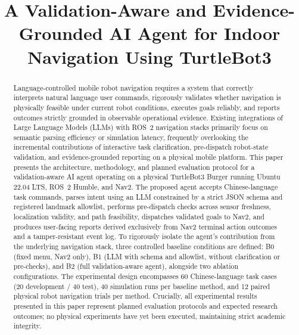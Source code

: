 \documentclass[conference]{IEEEtran}
\begin{document}
\title{A Validation-Aware and Evidence-Grounded AI Agent for Indoor Navigation Using TurtleBot3}

\author{
}

\maketitle

\begin{abstract}
Language-controlled mobile robot navigation requires a system that correctly interprets natural language user commands, rigorously validates whether navigation is physically feasible under current robot conditions, executes goals reliably, and reports outcomes strictly grounded in observable operational evidence. Existing integrations of Large Language Models (LLMs) with ROS~2 navigation stacks primarily focus on semantic parsing efficiency or simulation latency, frequently overlooking the incremental contributions of interactive task clarification, pre-dispatch robot-state validation, and evidence-grounded reporting on a physical mobile platform. This paper presents the architecture, methodology, and planned evaluation protocol for a validation-aware AI agent operating on a physical TurtleBot3 Burger running Ubuntu 22.04 LTS, ROS~2 Humble, and Nav2. The proposed agent accepts Chinese-language task commands, parses intent using an LLM constrained by a strict JSON schema and registered landmark allowlist, performs pre-dispatch checks across sensor freshness, localization validity, and path feasibility, dispatches validated goals to Nav2, and produces user-facing reports derived exclusively from Nav2 terminal action outcomes and a tamper-resistant event log. To rigorously isolate the agent's contribution from the underlying navigation stack, three controlled baseline conditions are defined: B0 (fixed menu, Nav2 only), B1 (LLM with schema and allowlist, without clarification or pre-checks), and B2 (full validation-aware agent), alongside two ablation configurations. The experimental design encompasses 60 Chinese-language task cases (20 development / 40 test), 40 simulation runs per baseline method, and 12 paired physical robot navigation trials per method. Crucially, all experimental results presented in this paper represent planned evaluation protocols and expected research outcomes; no physical experiments have yet been executed, maintaining strict academic integrity.
\end{abstract}
\end{document}
